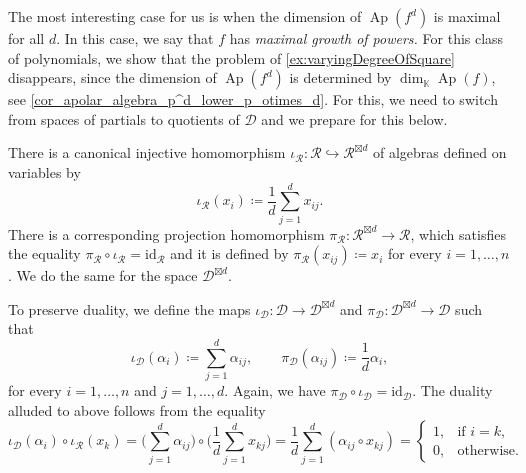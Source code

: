 \documentclass[a4paper,11pt,reqno]{amsart}
\newcommand{\Sum}{\displaystyle\sum}
\newcommand{\calD}{\mathcal{D}}
\newcommand{\calR}{\mathcal{R}}
\newcommand{\bbK}{\mathbb{K}}
\newcommand{\id}{\mathrm{id}}
\DeclareMathOperator{\Ap}{Ap}
\numberwithin{equation}{section}
\theoremstyle{definition}
\theoremstyle{plain}
\theoremstyle{remark}
\begin{document}
The most interesting case for us is when the dimension of $\Ap(f^d)$ is
maximal for all $d$. {In this case}, we say that $f$ has \emph{maximal growth
of powers.} For this class of polynomials, we  show that the problem of \autoref{ex:varyingDegreeOfSquare} disappears, since the dimension of $\Ap(f^d)$ is
determined by $\dim_{\bbK}\Ap(f)$, see
\autoref{cor_apolar_algebra_p^d_lower_p_otimes_d}.
For this, we need to switch from spaces of partials to quotients of $\calD$ and { we prepare for this below.}

\newcommand{\injR}{\iota_{\calR}}
\newcommand{\projR}{\pi_{\calR}}
\newcommand{\injD}{\iota_{\calD}}
\newcommand{\projD}{\pi_{\calD}}
There is a canonical injective homomorphism $\injR\colon \calR \hookrightarrow
\calR^{\boxtimes d}$ of
algebras defined on variables by
\[
    \injR\left( x_i \right) \coloneq \frac{1}{d}\sum_{j=1}^dx_{ij}.
\]
There is a corresponding projection homomorphism
$\projR\colon\calR^{\boxtimes d}\to \calR$, which satisfies the equality
$\projR\circ\injR=\id_{\calR}$
and it is defined by $\projR(x_{ij}) \coloneq x_i$ for every $i=1,\dots,n$.
We do the same for the space $\calD^{\boxtimes d}$.

To preserve duality, we define the maps $\injD\colon \calD\to \calD^{\boxtimes
d}$ and $\projD\colon \calD^{\boxtimes d}\to \calD$ such that
\[
    \injD(\alpha_i) \coloneq \sum_{j=1}^d\alpha_{ij},\qquad
    \projD(\alpha_{ij}) \coloneq \frac{1}{d}\alpha_i,
\]
for every $i=1,\dots,n$ and $j=1,\dots,d$.
Again, we have $\projD\circ\injD=\id_{\calD}$.
The duality alluded to above follows from the equality
\[
\injD(\alpha_i)\circ
\injR(x_k)=\biggl(\Sum_{j=1}^d\alpha_{ij}\biggr)\circ\biggl(\dfrac{1}{d}\Sum_{j=1}^dx_{kj}\biggr)=\frac{1}{d}\sum_{j=1}^d(\alpha_{ij}\circ
x_{kj})=\begin{cases}
    1, & \text{if $i = k$},\\
    0, & \text{otherwise}.
\end{cases}
\]
\end{document}
